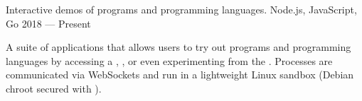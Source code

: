 \showoff
{}
{Interactive demos of programs and programming languages.}
{Node.js, JavaScript, Go}
{2018 --- Present}

A suite of applications that allows users to try out programs and programming languages by accessing a , , or even experimenting from the . Processes are communicated via WebSockets and run in a lightweight Linux sandbox (Debian chroot secured with ).

